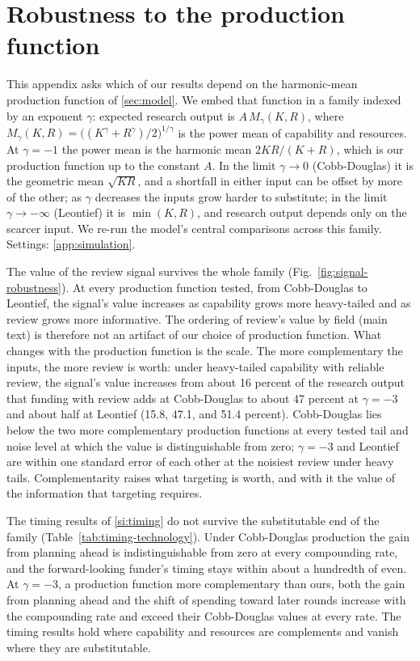 \section{Robustness to the production function}\label{app:technology}

This appendix asks which of our results depend on the harmonic-mean production function of \ref{sec:model}. We embed that function in a family indexed by an exponent $\gamma$: expected research output is $A\,M_\gamma(K, R)$, where $M_\gamma(K, R) = \big((K^{\gamma} + R^{\gamma})/2\big)^{1/\gamma}$ is the power mean of capability and resources. At $\gamma = -1$ the power mean is the harmonic mean $2KR/(K + R)$, which is our production function up to the constant $A$. In the limit $\gamma \to 0$ (Cobb-Douglas) it is the geometric mean $\sqrt{KR}$, and a shortfall in either input can be offset by more of the other; as $\gamma$ decreases the inputs grow harder to substitute; in the limit $\gamma \to -\infty$ (Leontief) it is $\min(K, R)$, and research output depends only on the scarcer input. We re-run the model's central comparisons across this family. Settings: \ref{app:simulation}.

The value of the review signal survives the whole family (Fig.~\ref{fig:signal-robustness}). At every production function tested, from Cobb-Douglas to Leontief, the signal's value increases as capability grows more heavy-tailed and as review grows more informative. The ordering of review's value by field (main text) is therefore not an artifact of our choice of production function. What changes with the production function is the scale. The more complementary the inputs, the more review is worth: under heavy-tailed capability with reliable review, the signal's value increases from about 16 percent of the research output that funding with review adds at Cobb-Douglas to about 47 percent at $\gamma = -3$ and about half at Leontief (15.8, 47.1, and 51.4 percent). Cobb-Douglas lies below the two more complementary production functions at every tested tail and noise level at which the value is distinguishable from zero; $\gamma = -3$ and Leontief are within one standard error of each other at the noisiest review under heavy tails. Complementarity raises what targeting is worth, and with it the value of the information that targeting requires.



The timing results of \ref{si:timing} do not survive the substitutable end of the family (Table~\ref{tab:timing-technology}). Under Cobb-Douglas production the gain from planning ahead is indistinguishable from zero at every compounding rate, and the forward-looking funder's timing stays within about a hundredth of even. At $\gamma = -3$, a production function more complementary than ours, both the gain from planning ahead and the shift of spending toward later rounds increase with the compounding rate and exceed their Cobb-Douglas values at every rate. The timing results hold where capability and resources are complements and vanish where they are substitutable.

